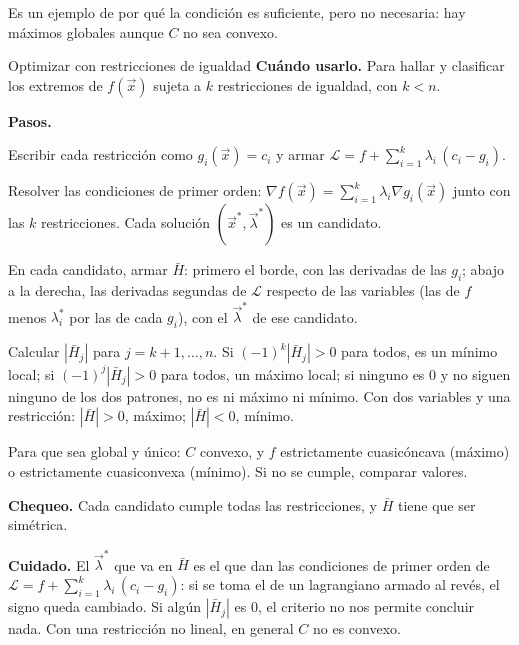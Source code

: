 \documentclass{article}
\newcommand{\rotulo}[2][principal]{\textsf{\bfseries\color{#1}#2}\enspace}
\newcommand{\vect}[1]{\vec{#1}}
\begin{document}

Es un ejemplo de por qué la condición es suficiente, pero no necesaria: hay máximos globales aunque \(C\) no sea convexo.

\begin{metodo}[label=met:igualdad]{Optimizar con restricciones de igualdad}
\rotulo{Cuándo usarlo.} Para hallar y clasificar los extremos de \(f(\vect{x})\) sujeta a \(k\) restricciones de igualdad, con \(k<n\).

\rotulo{Pasos.}
\begin{pasos}
  \item Escribir cada restricción como \(g_i(\vect{x})=c_i\) y armar \(\mathcal L=f+\sum_{i=1}^k\lambda_i\,(c_i-g_i)\).
  \item Resolver las condiciones de primer orden: \(\nabla f(\vect{x})=\sum_{i=1}^k\lambda_i\nabla g_i(\vect{x})\) junto con las \(k\) restricciones. Cada solución \((\vect{x}^*,\vect{\lambda}^*)\) es un candidato.
  \item En cada candidato, armar \(\bar H\): primero el borde, con las derivadas de las \(g_i\); abajo a la derecha, las derivadas segundas de \(\mathcal L\) respecto de las variables (las de \(f\) menos \(\lambda_i^*\) por las de cada \(g_i\)), con el \(\vect{\lambda}^*\) de ese candidato.
  \item Calcular \(|\bar H_j|\) para \(j=k+1,\dots,n\). Si \((-1)^k|\bar H_j|>0\) para todos, es un mínimo local; si \((-1)^j|\bar H_j|>0\) para todos, un máximo local; si ninguno es \(0\) y no siguen ninguno de los dos patrones, no es ni máximo ni mínimo. Con dos variables y una restricción: \(|\bar H|>0\), máximo; \(|\bar H|<0\), mínimo.
  \item Para que sea global y único: \(C\) convexo, y \(f\) estrictamente cuasicóncava (máximo) o estrictamente cuasiconvexa (mínimo). Si no se cumple, comparar valores.
\end{pasos}

\rotulo{Chequeo.} Cada candidato cumple todas las restricciones, y \(\bar H\) tiene que ser simétrica.

\rotulo[oxido]{Cuidado.} El \(\vect{\lambda}^*\) que va en \(\bar H\) es el que dan las condiciones de primer orden de \(\mathcal L=f+\sum_{i=1}^k\lambda_i\,(c_i-g_i)\): si se toma el de un lagrangiano armado al revés, el signo queda cambiado. Si algún \(|\bar H_j|\) es \(0\), el criterio no nos permite concluir nada. Con una restricción no lineal, en general \(C\) no es convexo.
\end{metodo}
\end{document}
